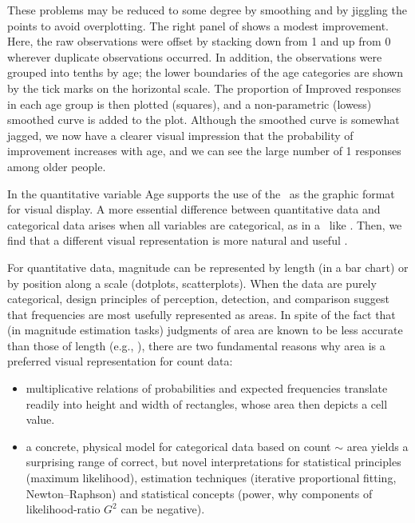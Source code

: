These problems may be reduced to some degree by smoothing and by
jiggling the points to avoid overplotting.
The right panel of  shows a modest improvement.
Here, the raw observations were offset by stacking down from 1 and up
from 0 wherever duplicate observations occurred.
In addition, the observations were grouped into tenths by age; the lower
boundaries of the age categories are shown by the tick marks on the horizontal
scale.  The proportion of Improved responses in each age group is then
plotted (squares), and a non-parametric (lowess) smoothed curve is added
to the plot.
Although the smoothed curve is somewhat jagged, we now have a clearer
visual impression that the probability of improvement increases with age,
and we can see the large number of 1 responses among older people.

In  the quantitative variable Age supports
the use of the \scat\ as the graphic format for visual display. 
A more essential difference between quantitative data and categorical
data arises when all variables are categorical, as in a \ctab\
like .   Then, we find that a different visual
representation is more natural and useful
\citep{Friendly:95,Friendly:97}.  

For quantitative data, magnitude can
be represented by length (in a bar chart) or by position along a
scale (dotplots, scatterplots).  When the data are purely categorical,
design principles of perception, detection, and comparison
\citep{Friendly:99} suggest that frequencies are most usefully
represented as areas.  In spite of the fact that
(in magnitude estimation tasks) judgments of
area are known to be less accurate than those of length
(e.g., \citet{ClevelandMcGill:84b}), there
are two fundamental reasons why area is a preferred visual representation
for count data:
\begin{itemize}
\item multiplicative relations of probabilities and expected frequencies
translate readily into height and width of rectangles, whose area then
depicts a cell value.

\item a concrete, physical model for categorical data \citep{Friendly:95}
based on count $\sim$ area 
yields a surprising range of correct, but novel
interpretations for statistical principles (maximum likelihood),
estimation techniques (iterative proportional fitting, Newton--Raphson)
and statistical concepts (power, why components of likelihood-ratio $G^2$ can be
negative).
\end{itemize}

